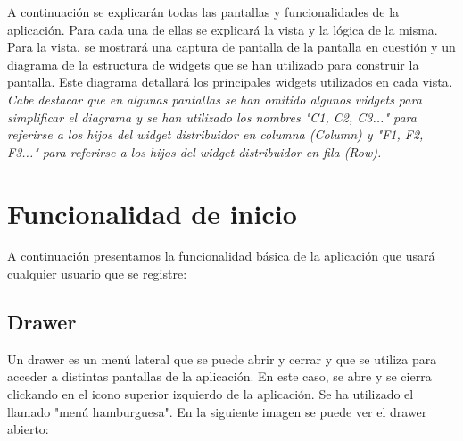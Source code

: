 A continuación se explicarán todas las pantallas y funcionalidades de la aplicación. Para cada una de ellas se explicará la vista y la lógica de la misma. 
Para la vista, se mostrará una captura de pantalla de la pantalla en cuestión y un diagrama de la estructura de widgets que se han utilizado para construir la pantalla. 
Este diagrama detallará los principales widgets utilizados en cada vista. \textit{Cabe destacar que en algunas pantallas se han omitido algunos widgets para simplificar 
el diagrama y se han utilizado los nombres "C1, C2, C3..." para referirse a los hijos del widget distribuidor en columna (Column) y "F1, F2, F3..." para referirse a los hijos
 del widget distribuidor en fila (Row).}
\newpage


\section{Funcionalidad de inicio}
\label{sec:inicio}
A continuación presentamos la funcionalidad básica de la aplicación que usará cualquier usuario que se registre:




\subsection{Drawer}
Un drawer es un menú lateral que se puede abrir y cerrar y que se utiliza para acceder a distintas pantallas de la aplicación. En este caso, se
abre y se cierra clickando en el icono superior izquierdo de la aplicación. Se ha utilizado el llamado "menú hamburguesa". En la siguiente imagen se puede ver el drawer abierto:

